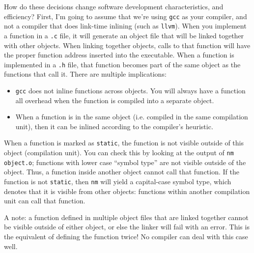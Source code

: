 \documentclass[11pt,onecolumn]{article}
\begin{document}
How do these decisions change software development characteristics,
and efficiency?  First, I'm going to assume that we're using {\tt gcc}
as your compiler, and not a compiler that does link-time inlining
(such as {\tt llvm}).  When you implement a function in a {\tt *.c}
file, it will generate an object file that will be linked together
with other objects.  When linking together objects, calls to that
function will have the proper function address inserted into the
executable.  When a function is implemented in a {\tt *.h} file, that
function becomes part of the same object as the functions that call
it.  There are multiple implications:
\begin{itemize}[itemsep=0pt,topsep=1pt,parsep=1pt,leftmargin=2.5em]
\item {\tt gcc} does not inline functions across objects.  You will
  always have a function all overhead when the function is compiled
  into a separate object.
\item When a function is in the same object (i.e. compiled in the same
  compilation unit), then it can be inlined according to the
  compiler's heuristic.
\end{itemize}

When a function is marked as {\tt static}, the function is not visible
outside of this object (compilation unit).  You can check this by
looking at the output of {\tt nm object.o}; functions with lower case
``symbol type'' are not visible outside of the object.  Thus, a
function inside another object cannot call that function.  If the
function is not {\tt static}, then {\tt nm} will yield a capital-case
symbol type, which denotes that it is visible from other objects:
functions within another compilation unit can call that function.

A note: a function defined in multiple object files that are linked
together cannot be visible outside of either object, or else the
linker will fail with an error.  This is the equivalent of defining
the function twice!  No compiler can deal with this case well.
\end{document}
